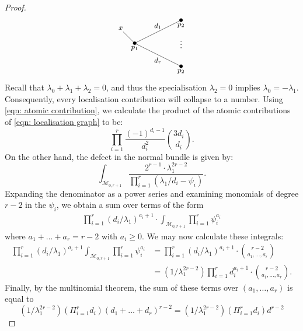 \documentclass[11pt]{amsart}
\theoremstyle{definition}
\theoremstyle{definition}
\newcommand{\ol}[1]{\overline{#1}}
\newcommand{\Mcal}{\mathcal{M}}
\begin{document}
\begin{proof}
\begin{equation}
\begin{tikzpicture}[baseline=(current  bounding  box.center)]
	\draw[fill] (0,0) circle[radius=2pt];
	\draw (0,0) node[below]{\small$p_1$};
	
	\draw (0,0) -- (-0.5,0.5);
	\draw (-0.6,0.65) node{\small$x$};
	
	\draw (0,0) -- (2,1);
	\draw (1,0.5) node[above]{\small$d_1$};
	\draw[fill] (2,1) circle[radius=2pt];
	\draw (2,1) node[below]{\small$p_2$};
	
	\draw (0,0) -- (2,-1);
	\draw (1,-0.5) node[below]{\small$d_r$};
	\draw[fill] (2,-1) circle[radius=2pt];
	\draw (2,-1) node[below]{\small$p_2$};
	
	\draw (2,0.05) node{$\vdots$};
	
\end{tikzpicture}	
\end{equation}
Recall that $\lambda_0+\lambda_1+\lambda_2=0$, and thus the specialisation $\lambda_2=0$ implies $\lambda_0=-\lambda_1$. Consequently, every localisation contribution will collapse to a number. Using \eqref{eqn: atomic contribution}, we calculate the product of the atomic contributions of \eqref{eqn: localisation graph} to be:
\begin{equation*} \prod_{i=1}^r \dfrac{(-1)^{d_i - 1}}{d_i^2} {3d_i \choose d_i}.\end{equation*}
On the other hand, the defect in the normal bundle is given by:
\begin{equation*} \int_{\ol{\Mcal}_{0,r+1}} \dfrac{2^{r-1} \cdot \lambda_1^{2r-2}}{\prod_{i=1}^r ( \lambda_1/d_i - \psi_i)}.\end{equation*}
Expanding the denominator as a power series and examining monomials of degree $r-2$ in the $\psi_i$, we obtain a sum over terms of the form
\begin{align*} \prod_{i=1}^r (d_i/\lambda_1)^{a_i+1} \cdot \int_{\ol\Mcal_{0,r+1}} \prod_{i=1}^r \psi_i^{a_i} \end{align*}
where $a_1+\ldots+a_r = r-2$ with $a_i \geq 0$. We may now calculate these integrals:
\begin{align*} \prod_{i=1}^r (d_i/\lambda_1)^{a_i+1} \int_{\ol\Mcal_{0,r+1}} \prod_{i=1}^r \psi_i^{a_i} & = \prod_{i=1}^r (d_i/\lambda_1)^{a_i+1}  \cdot {r-2 \choose a_1, \ldots, a_r} \\
& = (1/\lambda_1^{2r-2})  \prod_{i=1}^r d_i^{a_i+1} \cdot {r-2 \choose a_1, \ldots, a_r}. \end{align*}
Finally, by the multinomial theorem, the sum of these terms over $(a_1,\ldots,a_r)$ is equal to
\begin{equation*} (1/\lambda_1^{2r-2}) \left( \Pi_{i=1}^r d_i \right) (d_1+\ldots+d_r)^{r-2} = (1/\lambda_1^{2r-2}) \left( \Pi_{i=1}^r d_i \right) d^{r-2}\end{equation*}

\end{proof}
\end{document}
